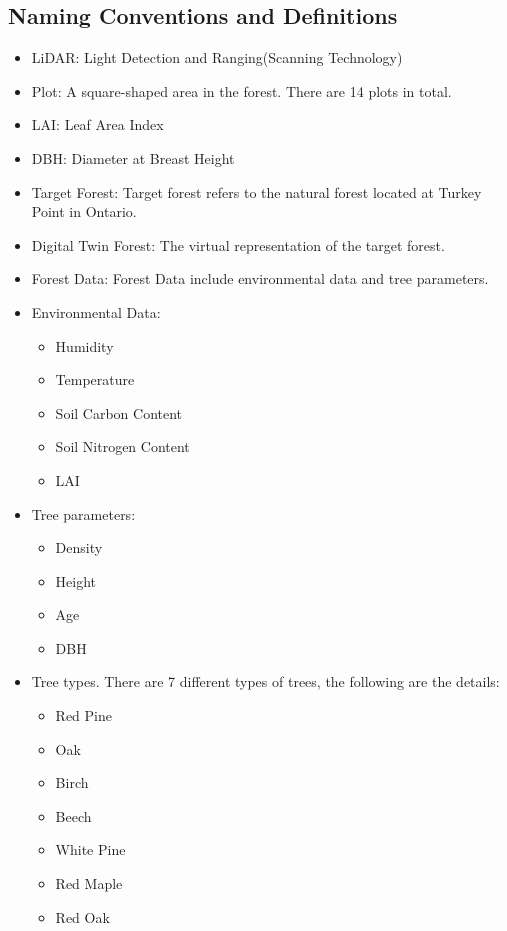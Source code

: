\documentclass{article}
\begin{document}
\subsection{Naming Conventions and Definitions}
\begin{itemize}
    \item LiDAR: Light Detection and Ranging(Scanning Technology)
    \item Plot: A square-shaped area in the forest. There are 14 plots in total. 
    \item LAI: Leaf Area Index
    \item DBH: Diameter at Breast Height
    \item Target Forest: Target forest refers to the natural forest located at Turkey
    Point in Ontario.
    \item Digital Twin Forest: The virtual representation of the target forest.
    \item Forest Data: Forest Data include environmental data and tree parameters.
    \item Environmental Data:
    \begin{itemize}
        \item Humidity
        \item Temperature
        \item Soil Carbon Content
        \item Soil Nitrogen Content
        \item LAI 
    \end{itemize}
    \item Tree parameters: 
    \begin{itemize}
        \item Density
        \item Height
        \item Age
        \item DBH 
    \end{itemize}
    \item Tree types. There are 7 different types of trees,
    the following are the details:
    \begin{itemize}
        \item Red Pine
        \item Oak
        \item Birch 
        \item Beech
        \item White Pine
        \item Red Maple
        \item Red Oak
    \end{itemize}
\end{itemize}
\end{document}
